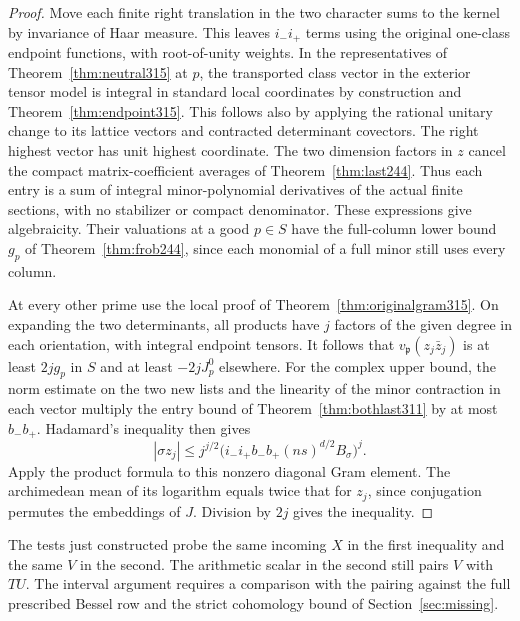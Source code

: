 \documentclass[a4paper,11pt]{article}
\theoremstyle{definition}
\theoremstyle{remark}
\numberwithin{equation}{section}
\begin{document}
\begin{proof}
Move each finite right translation in the two character sums
to the kernel by invariance of Haar measure. This leaves
\(i_-i_+\) terms using the original one-class endpoint
functions, with root-of-unity weights. In the representatives
of Theorem~\ref{thm:neutral315} at \(p\), the transported
class vector in the exterior tensor model is integral in
standard local coordinates by construction and
Theorem~\ref{thm:endpoint315}. This follows also by applying
the rational unitary change to its lattice vectors and
contracted determinant covectors. The right highest vector
has unit highest coordinate. The two dimension factors in
\(z\) cancel the compact matrix-coefficient averages of
Theorem~\ref{thm:last244}. Thus each entry is a sum of
integral minor-polynomial derivatives of the actual finite
sections, with no stabilizer or compact denominator. These
expressions give algebraicity. Their valuations at a good
\(p\in S\) have the full-column lower bound \(g_p\) of
Theorem~\ref{thm:frob244}, since each monomial of a full
minor still uses every column.

At every other prime use the local proof of
Theorem~\ref{thm:originalgram315}. On expanding the two
determinants, all products have \(j\) factors of the given
degree in each orientation, with integral endpoint tensors.
It follows that \(v_{\mathfrak p}(z_j\bar z_j)\) is at least
\(2jg_p\) in \(S\) and at least \(-2j J^0_p\) elsewhere.
For the complex upper bound, the norm estimate on the two
new lists and the linearity of the minor contraction in each
vector multiply the entry bound of
Theorem~\ref{thm:bothlast311} by at most \(b_-b_+\).
Hadamard's inequality then gives
\[
 |\sigma z_j|\le j^{j/2}
       \big(i_-i_+ b_-b_+(ns)^{d/2} B_\sigma\big)^j .
\]
Apply the product formula to this nonzero diagonal Gram element.
The archimedean mean of its logarithm equals twice that for
\(z_j\), since conjugation permutes the embeddings of \(J\).
Division by \(2j\) gives the inequality.
\end{proof}

The tests just constructed probe the same incoming \(X\) in
the first inequality and the same \(V\) in the second. The
arithmetic scalar in the second still pairs \(V\) with \(TU\).
The interval argument requires a comparison with the pairing
against the full prescribed Bessel row and the strict cohomology
bound of Section~\ref{sec:missing}.
\end{document}
